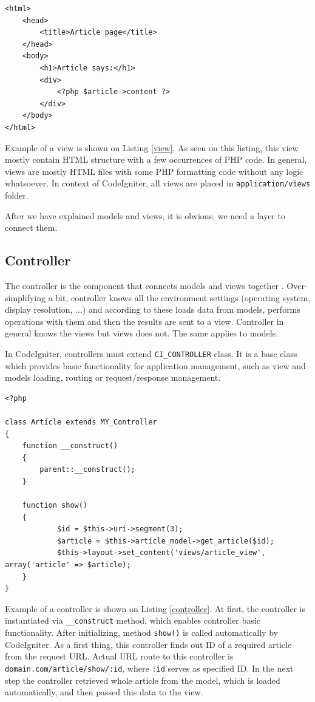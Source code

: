 \begin{lstlisting}[label={view}, caption={Article view}]
<html>
	<head>
		<title>Article page</title>
	</head>
	<body>
		<h1>Article says:</h1>
		<div>
			<?php $article->content ?>
		</div>
	</body>
</html>
\end{lstlisting}

Example of a view is shown on Listing \ref{view}.  As seen on this listing, this view mostly contain HTML structure with a few occurrences of PHP code. In general, views are mostly HTML files with some PHP formatting code without any logic whatsoever. In context of CodeIgniter, all views are placed in \texttt{application/views} folder.

After we have explained models and views, it is obvious, we need a layer to connect them.

\subsection{Controller}
The controller is the component that connects models and views together \cite{phpmvc}. Over-simplifying a bit, controller knows all the environment settings (operating system, display resolution, ...) and according to these loads data from models, performs operations with them and then the results are sent to a view. Controller in general knows the views but views does not. The same applies to models.

In CodeIgniter, controllers must extend \texttt{CI\_CONTROLLER} class. It is a base class which provides basic functionality for application management, such as view and models loading, routing or request/response management.

\begin{lstlisting}[label={controller}, caption={Article controller}]
<?php

class Article extends MY_Controller
{
    function __construct()
    {
        parent::__construct();
    }

    function show()
    {
    		$id = $this->uri->segment(3);
    		$article = $this->article_model->get_article($id);
    		$this->layout->set_content('views/article_view', array('article' => $article);
    }
}
\end{lstlisting}


Example of a controller is shown on Listing \ref{controller}. At first, the controller is instantiated via \texttt{\_\_construct} method, which enables controller basic functionality. After initializing, method \texttt{show()} is called automatically by CodeIgniter. As a first thing, this controller finds out ID of a required article from the request URL. Actual URL route to this controller is \texttt{domain.com/article/show/:id}, where \texttt{:id} serves as specified ID. In the next step the controller retrieved whole article from the model, which is loaded automatically, and then passed this data to the view.

